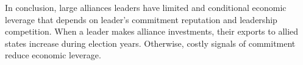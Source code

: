 \documentclass[12pt]{article}
\begin{document}
In conclusion, large alliances leaders have limited and conditional economic leverage that depends on leader's commitment reputation and leadership competition. 
When a leader makes alliance investments, their exports to allied states increase during election years. 
Otherwise, costly signals of commitment reduce economic leverage.


\newpage
\singlespace
 
 
\end{document}
